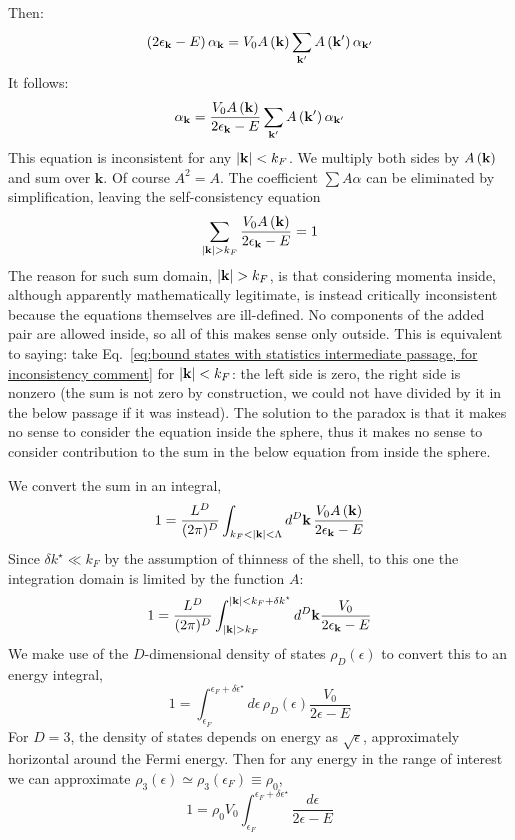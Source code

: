 Then:
\[
	\left({2 \epsilon_\mathbf{k} - E}\right) \alpha_\mathbf{k} = V_0 A\left({\mathbf{k}}\right) \sum_{\mathbf{k}'} A\left({\mathbf{k}'}\right) \alpha_{\mathbf{k}'}
\]
It follows:
\begin{equation}\label{eq:bound states with statistics intermediate passage, for inconsistency comment}
	\alpha_\mathbf{k} = \frac{V_0 A\left({\mathbf{k}}\right)}{2 \epsilon_\mathbf{k} - E} \sum_{\mathbf{k}'} A\left({\mathbf{k}'}\right) \alpha_{\mathbf{k}'}
\end{equation}
This equation is inconsistent for any $\abs{\mathbf{k}}<k_F$.
We multiply both sides by $A\left({\mathbf{k}}\right)$ and sum over $\mathbf{k}$. Of course $A^2 = A$. The coefficient $\sum A \alpha$ can be eliminated by simplification, leaving the self-consistency equation
\[
	\sum_{\abs{\mathbf{k}}>k_F} \frac{V_0 A\left({\mathbf{k}}\right)}{2 \epsilon_\mathbf{k} - E} = 1
\]
The reason for such sum domain, $\abs{\mathbf{k}}>k_F$, is that considering momenta inside, although apparently mathematically legitimate, is instead critically inconsistent because the equations themselves are ill-defined. No components of the added pair are allowed inside, so all of this makes sense only outside. This is equivalent to saying: take Eq.~\eqref{eq:bound states with statistics intermediate passage, for inconsistency comment} for $\abs{\mathbf{k}}<k_F$: the left side is zero, the right side is nonzero (the sum is not zero by construction, we could not have divided by it in the below passage if it was instead). The solution to the paradox is that it makes no sense to consider the equation inside the sphere, thus it makes no sense to consider contribution to the sum in the below equation from inside the sphere.

We convert the sum in an integral,
\[
	1 = \frac{L^D}{(2\pi)^D} \int_{k_F<\abs{\mathbf{k}}<\Lambda} d^D \mathbf{k} \, \frac{V_0 A\left({\mathbf{k}}\right)}{2 \epsilon_\mathbf{k} - E}
\]
Since $\delta k^\star \ll k_F$ by the assumption of thinness of the shell, to this one the integration domain is limited by the function $A$:
\[
	1 = \frac{L^D}{(2\pi)^D} \int_{\abs{\mathbf{k}} > k_F}^{\abs{\mathbf{k}} < k_F+\delta k^\star} d^D \mathbf{k} \frac{V_0}{2 \epsilon_\mathbf{k} - E}
\]
We make use of the $D$-dimensional density of states $\rho_D(\epsilon)$ to convert this to an energy integral,
\[
	1 = \int_{\epsilon_F}^{\epsilon_F+\delta\epsilon^\star} d\epsilon \, \rho_D(\epsilon) \frac{V_0}{2 \epsilon - E}
\]
For $D=3$, the density of states depends on energy as $\sqrt{\epsilon}$, approximately horizontal around the Fermi energy. Then for any energy in the range of interest we can approximate $\rho_3 (\epsilon) \simeq \rho_3 (\epsilon_F) \equiv \rho_0$,
\[
	1 = \rho_0 V_0 \int_{\epsilon_F}^{\epsilon_F+\delta\epsilon^\star} \frac{d\epsilon}{2 \epsilon - E}
\]

